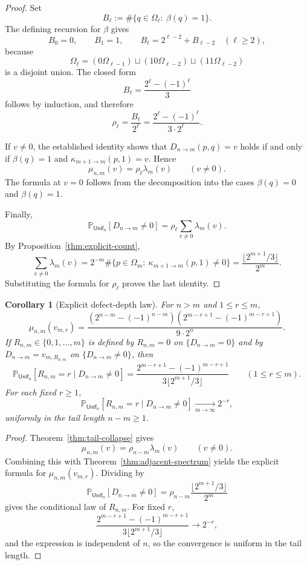 \documentclass[11pt,reqno]{amsart}
\numberwithin{equation}{section}
\theoremstyle{plain}
\newtheorem{corollary}[theorem]{Corollary}
\theoremstyle{definition}
\theoremstyle{remark}
\newcommand{\PP}{\mathbb{P}}
\newcommand{\Unif}{\mathsf{Unif}}
\begin{document}
\begin{proof}
Set
\[
B_\ell:=\#\{q\in\Omega_\ell:\ \beta(q)=1\}.
\]
The defining recursion for $\beta$ gives
\[
B_0=0,
\qquad
B_1=1,
\qquad
B_\ell=2^{\ell-2}+B_{\ell-2}\quad (\ell\ge 2),
\]
because
\[
\Omega_\ell=(0\Omega_{\ell-1})\sqcup(10\Omega_{\ell-2})\sqcup(11\Omega_{\ell-2})
\]
is a disjoint union.  The closed form
\[
B_\ell=\frac{2^\ell-(-1)^\ell}{3}
\]
follows by induction, and therefore
\[
\rho_\ell=\frac{B_\ell}{2^\ell}
=
\frac{2^\ell-(-1)^\ell}{3\cdot 2^\ell}.
\]

If $v\ne 0$, the established identity shows that
$D_{n\to m}(p,q)=v$ holds if and only if $\beta(q)=1$ and
$\kappa_{m+1\to m}(p,1)=v$.  Hence
\[
\mu_{n,m}(v)=\rho_\ell\lambda_m(v)
\qquad (v\ne 0).
\]
The formula at $v=0$ follows from the decomposition into the cases
$\beta(q)=0$ and $\beta(q)=1$.

Finally,
\[
\PP_{\Unif_n}[D_{n\to m}\ne 0]
=
\rho_\ell\sum_{v\ne 0}\lambda_m(v).
\]
By Proposition~\ref{thm:explicit-count},
\[
\sum_{v\ne 0}\lambda_m(v)
=
2^{-m}\#\{p\in\Omega_m:\ \kappa_{m+1\to m}(p,1)\ne 0\}
=
\frac{\lfloor 2^{m+1}/3\rfloor}{2^m}.
\]
Substituting the formula for $\rho_\ell$ proves the last identity.
\end{proof}

\begin{corollary}[Explicit defect-depth law]
\label{cor:explicit-depth-law}
For $n>m$ and $1\le r\le m$,
\[
\mu_{n,m}(v_{m,r})
=
\frac{(2^{n-m}-(-1)^{n-m})(2^{m-r+1}-(-1)^{m-r+1})}{9\cdot 2^n}.
\]
If $R_{n,m}\in\{0,1,\dots,m\}$ is defined by $R_{n,m}=0$ on $\{D_{n\to m}=0\}$
and by $D_{n\to m}=v_{m,R_{n,m}}$ on $\{D_{n\to m}\ne 0\}$, then
\[
\PP_{\Unif_n}[R_{n,m}=r\mid D_{n\to m}\ne 0]
=
\frac{2^{m-r+1}-(-1)^{m-r+1}}{3\lfloor 2^{m+1}/3\rfloor}
\qquad (1\le r\le m).
\]
For each fixed $r\ge 1$,
\[
\PP_{\Unif_n}[R_{n,m}=r\mid D_{n\to m}\ne 0]
\xrightarrow[m\to\infty]{}
2^{-r},
\]
uniformly in the tail length $n-m\ge 1$.
\end{corollary}

\begin{proof}
Theorem~\ref{thm:tail-collapse} gives
\[
\mu_{n,m}(v)=\rho_{n-m}\lambda_m(v)
\qquad (v\ne 0).
\]
Combining this with Theorem~\ref{thm:adjacent-spectrum} yields the explicit
formula for $\mu_{n,m}(v_{m,r})$.  Dividing by
\[
\PP_{\Unif_n}[D_{n\to m}\ne 0]
=
\rho_{n-m}\frac{\lfloor 2^{m+1}/3\rfloor}{2^m}
\]
gives the conditional law of $R_{n,m}$.  For fixed $r$,
\[
\frac{2^{m-r+1}-(-1)^{m-r+1}}{3\lfloor 2^{m+1}/3\rfloor}
\longrightarrow
2^{-r},
\]
and the expression is independent of $n$, so the convergence is uniform in the
tail length.
\end{proof}
\end{document}
